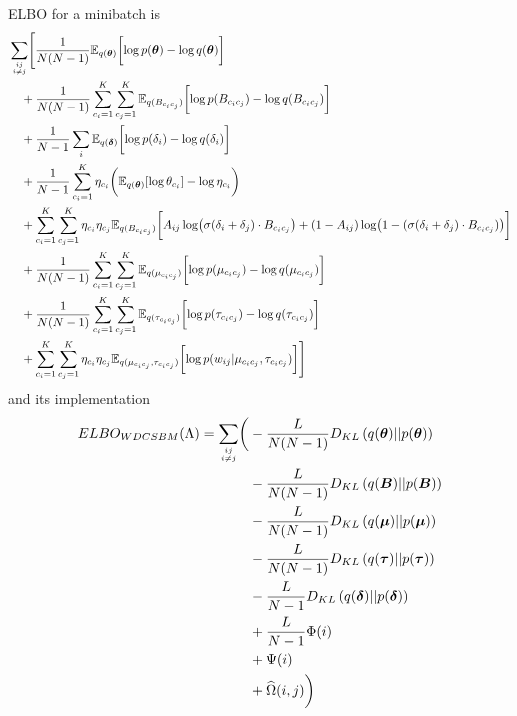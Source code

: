 \documentclass{article}
\renewcommand{\v}[1]{\bm{#1}}
\newcommand{\E}{\mathbb{E}}
\begin{document}
ELBO for a minibatch is
\begin{equation}
\begin{split}
& \sum_{ij \atop i \neq j} \Biggl[ \frac{1}{N (N - 1)} \E_{q(\v{\theta})}\biggl[
	\log p(\v{\theta}) - \log q(\v{\theta})\biggr]  \\
&  \quad + \frac{1}{N (N - 1)} \sum_{c_i=1}^K \sum_{c_j=1}^K  \E_{q(B_{c_ic_j})}\biggl[
	\log p(B_{c_ic_j}) - \log q(B_{c_ic_j})\biggr] \\
&  \quad + \frac{1}{N - 1} \sum_i \E_{q(\v{\delta})}\biggl[
	\log p(\delta_i) - \log q(\delta_i)\biggr] \\
&  \quad + \frac{1}{N - 1} \sum_{c_i=1}^K \eta_{c_i} \biggl(\E_{q(\v{\theta})}[
	\log \theta_{c_i}] - \log \eta_{c_i}\biggr) \\
&  \quad + \sum_{c_i=1}^K \sum_{c_j=1}^K \eta_{c_i} \eta_{c_j}
	\E_{q(B_{c_ic_j})}\biggl[ A_{ij} \log \bigl(\sigma(\delta_i + \delta_j) \cdot B_{c_ic_j}\bigr) 
	+ (1 - A_{ij}) \log \bigl(1 - (\sigma(\delta_i + \delta_j) \cdot B_{c_ic_j})\bigr) \biggr]\\
&  \quad + \frac{1}{N (N - 1)} \sum_{c_i=1}^K \sum_{c_j=1}^K  \E_{q(\mu_{c_ic_j})}\biggl[
	\log p(\mu_{c_ic_j}) - \log q(\mu_{c_ic_j})\biggr] \\
&  \quad + \frac{1}{N (N - 1)} \sum_{c_i=1}^K \sum_{c_j=1}^K  \E_{q(\tau_{c_ic_j})}\biggl[
	\log p(\tau_{c_ic_j}) - \log q(\tau_{c_ic_j})\biggr] \\
&  \quad + \sum_{c_i=1}^K \sum_{c_j=1}^K \eta_{c_i} \eta_{c_j}
	\E_{q(\mu_{c_ic_j},\tau_{c_ic_j})}\biggl[ \log p(w_{ij} | \mu_{c_ic_j}, \tau_{c_ic_j}) \biggr]\Biggr]
\end{split}
\end{equation}
and its implementation
\begin{equation}
\begin{split}
ELBO_{WDCSBM}(\Lambda) = \sum_{ij \atop i \neq j} \biggl( &- \frac{L}{N (N - 1)} D_{KL} \left(q(\v{\theta})||p(\v{\theta})\right)\\
\quad &- \frac{L}{N (N - 1)} D_{KL}\left(q(\v{B})||p(\v{B})\right) \\
\quad &- \frac{L}{N (N - 1)} D_{KL}\left(q(\v{\mu})||p(\v{\mu})\right) \\
\quad &- \frac{L}{N (N - 1)} D_{KL}\left(q(\v{\tau})||p(\v{\tau})\right) \\
\quad &- \frac{L}{N - 1} D_{KL} \left(q(\v{\delta})||p(\v{\delta})\right) \\
\quad &+ \frac{L}{N - 1}\Phi(i)\\
\quad &+ \Psi(i)\\
\quad &+ \widehat{\Omega}(i,j)   \biggr)
\end{split}
\end{equation} 
\end{document}
